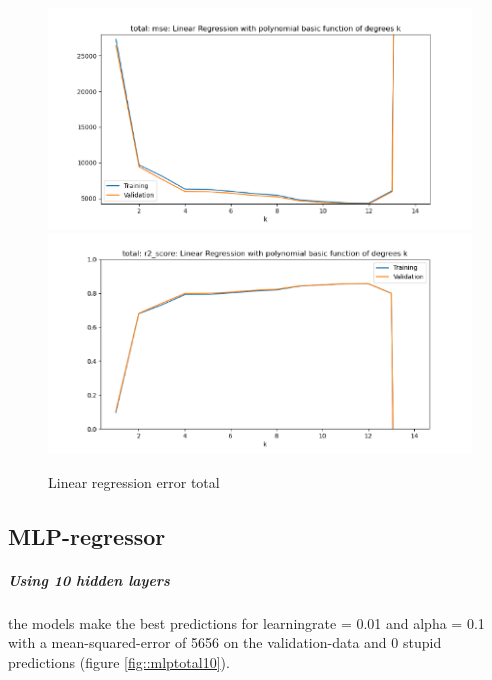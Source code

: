 \documentclass[12pt,a4paper]{scrartcl}		%
\begin{document}
\begin{figure}[h]
    \centering
    \includegraphics[scale = 0.8]{total_linreg_mse.png}
    \includegraphics[scale = 0.8]{total_linreg_r2.png}
    \caption{Linear regression error total}
    \label{fig::linregtotal}
\end{figure}

\subsection{MLP-regressor}

\subparagraph{Using 10 hidden layers}
the models make the best predictions for learningrate = 0.01 and alpha = 0.1 with a mean-squared-error of 5656 on the validation-data and 0 stupid predictions
(figure \ref{fig::mlptotal10}). 
\end{document}
